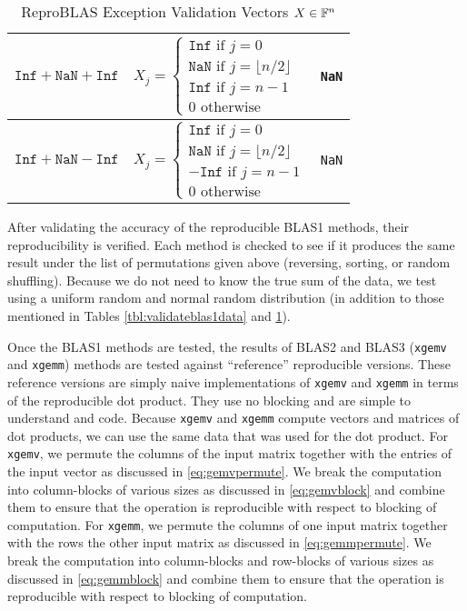 \begin{table}[!htbp]
\begin{tabular}{ | l |  l | l |}
            $\texttt{Inf} + \texttt{NaN} + \texttt{Inf}$ & $X_j = \begin{cases} \texttt{Inf} \text{ if } j = 0 \\ \texttt{NaN} \text{ if } j = \lfloor n/2 \rfloor \\ \texttt{Inf} \text{ if } j = n - 1 \\ 0 \text{ otherwise} \end{cases}$& \texttt{NaN}\\ \hline
            $\texttt{Inf} + \texttt{NaN} - \texttt{Inf}$ & $X_j = \begin{cases} \texttt{Inf} \text{ if } j = 0 \\ \texttt{NaN} \text{ if } j = \lfloor n/2 \rfloor \\ -\texttt{Inf} \text{ if } j = n - 1 \\ 0 \text{ otherwise} \end{cases}$& \texttt{NaN}\\ \hline
        \end{tabular}
        \caption{ReproBLAS Exception Validation Vectors $X \in \mathbb{F}^n$}
        \label{tbl:validateinfblas1data}
    \end{table}

  After validating the accuracy of the reproducible BLAS1 methods, their reproducibility is verified. Each method is checked to see if it produces the same result under the list of permutations given above (reversing, sorting, or random shuffling). Because we do not need to know the true sum of the data, we test using a uniform random and normal random distribution (in addition to those mentioned in Tables \ref{tbl:validateblas1data} and \ref{tbl:validateinfblas1data}).

  Once the BLAS1 methods are tested, the results of BLAS2 and BLAS3 (\texttt{xgemv} and \texttt{xgemm}) methods are tested against ``reference'' reproducible versions. These reference versions are simply naive implementations of \texttt{xgemv} and \texttt{xgemm} in terms of the reproducible dot product. They use no blocking and are simple to understand and code. Because \texttt{xgemv} and \texttt{xgemm} compute vectors and matrices of dot products, we can use the same data that was used for the dot product. For \texttt{xgemv}, we permute the columns of the input matrix together with the entries of the input vector as discussed in \eqref{eq:gemvpermute}. We break the computation into column-blocks of various sizes as discussed in \eqref{eq:gemvblock} and combine them to ensure that the operation is reproducible with respect to blocking of computation. For \texttt{xgemm}, we permute the columns of one input matrix together with the rows the other input matrix as discussed in \eqref{eq:gemmpermute}. We break the computation into column-blocks and row-blocks of various sizes as discussed in \eqref{eq:gemmblock} and combine them to ensure that the operation is reproducible with respect to blocking of computation.

